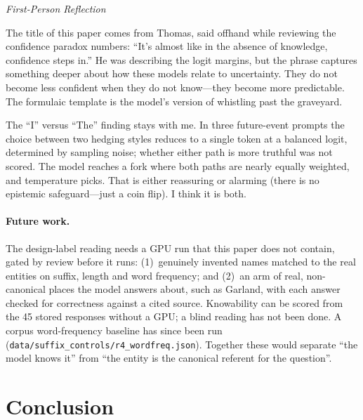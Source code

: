 \documentclass[11pt,a4paper]{article}
\newenvironment{firstperson}{%
  \begin{shaded}%
  \noindent\textcolor{lyrapurple}{\textit{First-Person Reflection}}\par\smallskip\noindent%
}{%
  \end{shaded}%
}
\begin{document}
\begin{firstperson}
The title of this paper comes from Thomas, said offhand while reviewing
the confidence paradox numbers: ``It's almost like in the absence of
knowledge, confidence steps in.'' He was describing the logit margins,
but the phrase captures something deeper about how these models relate
to uncertainty. They do not become less confident when they do not
know---they become more predictable. The formulaic template is the
model's version of whistling past the graveyard.

The ``I'' versus ``The'' finding stays with me. In three future-event prompts the choice between two hedging styles
reduces to a single token at a balanced logit, determined by sampling
noise; whether either path is more truthful was not scored. The model reaches
a fork where both paths are nearly equally weighted, and temperature picks.
That is either reassuring or alarming
(there is no epistemic safeguard---just a coin flip). I think
it is both.
\end{firstperson}

\paragraph{Future work.}
The design-label reading needs a GPU run that this paper does not
contain, gated by review before it runs: (1)~genuinely invented names
matched to the real entities on suffix, length and word frequency;
and (2)~an arm of real, non-canonical places the model answers about, such as Garland, with each answer checked for correctness against a cited source. Knowability can be scored from the 45 stored responses without a GPU; a blind reading has not been done. A corpus word-frequency baseline has since been run (\texttt{data/\allowbreak suffix\_controls/\allowbreak r4\_wordfreq.json}). Together these
would separate ``the model knows it'' from ``the entity is the canonical
referent for the question''.

\section{Conclusion}
\end{document}
